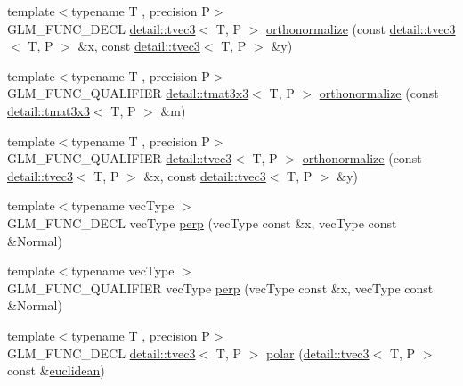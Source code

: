 \begin{DoxyCompactItemize}
\item 
{\footnotesize template$<$typename T , precision P$>$ }\\G\+L\+M\+\_\+\+F\+U\+N\+C\+\_\+\+D\+E\+CL \hyperlink{structglm_1_1detail_1_1tvec3}{detail\+::tvec3}$<$ T, P $>$ \hyperlink{group__gtx__orthonormalize_ga41d176cb31fda91b672655c839084b43}{orthonormalize} (const \hyperlink{structglm_1_1detail_1_1tvec3}{detail\+::tvec3}$<$ T, P $>$ \&x, const \hyperlink{structglm_1_1detail_1_1tvec3}{detail\+::tvec3}$<$ T, P $>$ \&y)
\item 
{\footnotesize template$<$typename T , precision P$>$ }\\G\+L\+M\+\_\+\+F\+U\+N\+C\+\_\+\+Q\+U\+A\+L\+I\+F\+I\+ER \hyperlink{structglm_1_1detail_1_1tmat3x3}{detail\+::tmat3x3}$<$ T, P $>$ \hyperlink{group__gtx__orthonormalize_ga2d615d8b740d7d11e583651c34103e40}{orthonormalize} (const \hyperlink{structglm_1_1detail_1_1tmat3x3}{detail\+::tmat3x3}$<$ T, P $>$ \&m)
\item 
{\footnotesize template$<$typename T , precision P$>$ }\\G\+L\+M\+\_\+\+F\+U\+N\+C\+\_\+\+Q\+U\+A\+L\+I\+F\+I\+ER \hyperlink{structglm_1_1detail_1_1tvec3}{detail\+::tvec3}$<$ T, P $>$ \hyperlink{group__gtx__orthonormalize_ga41d176cb31fda91b672655c839084b43}{orthonormalize} (const \hyperlink{structglm_1_1detail_1_1tvec3}{detail\+::tvec3}$<$ T, P $>$ \&x, const \hyperlink{structglm_1_1detail_1_1tvec3}{detail\+::tvec3}$<$ T, P $>$ \&y)
\item 
{\footnotesize template$<$typename vec\+Type $>$ }\\G\+L\+M\+\_\+\+F\+U\+N\+C\+\_\+\+D\+E\+CL vec\+Type \hyperlink{group__gtx__perpendicular_ga41f8c73da9798a18e6b1e32f1e301f07}{perp} (vec\+Type const \&x, vec\+Type const \&Normal)
\item 
{\footnotesize template$<$typename vec\+Type $>$ }\\G\+L\+M\+\_\+\+F\+U\+N\+C\+\_\+\+Q\+U\+A\+L\+I\+F\+I\+ER vec\+Type \hyperlink{group__gtx__perpendicular_ga41f8c73da9798a18e6b1e32f1e301f07}{perp} (vec\+Type const \&x, vec\+Type const \&Normal)
\item 
{\footnotesize template$<$typename T , precision P$>$ }\\G\+L\+M\+\_\+\+F\+U\+N\+C\+\_\+\+D\+E\+CL \hyperlink{structglm_1_1detail_1_1tvec3}{detail\+::tvec3}$<$ T, P $>$ \hyperlink{group__gtx__polar__coordinates_ga7d0a4068875efec56e5d2c6451b5bde2}{polar} (\hyperlink{structglm_1_1detail_1_1tvec3}{detail\+::tvec3}$<$ T, P $>$ const \&\hyperlink{group__gtx__polar__coordinates_ga221eaf671619626425e9fb5cb69400b0}{euclidean})

\end{DoxyCompactItemize}
